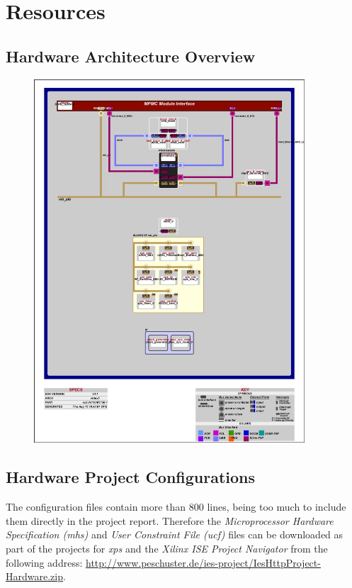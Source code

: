 \appendix 

\chapter{Resources}

\section{Hardware Architecture Overview}
\label{sec:hw_arch}

\begin{figure}[H]
\centering
\includegraphics[width=0.9\textwidth]{system_blkd.jpg}
\end{figure}


\section{Hardware Project Configurations}

The configuration files contain more than 800 lines, being too much to include them directly in the project report. Therefore the \textit{Microprocessor Hardware Specification (mhs)} and \textit{User Constraint File (ucf)} files can be downloaded as part of the projects for \textit{\gls{xps}} and the \textit{Xilinx ISE Project Navigator} from the following address: \url{http://www.peschuster.de/ies-project/IesHttpProject-Hardware.zip}.
\\

